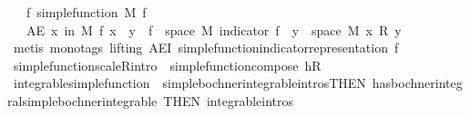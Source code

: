 \begin{isabellebody}
\ \ \ f{\isacharcolon}{\kern0pt}\ {\isachardoublequoteopen}simple{\isacharunderscore}{\kern0pt}function\ M\ f{\isachardoublequoteclose}\isanewline
\ \ \ {\isachardoublequoteopen}AE\ x\ in\ M{\isachardot}{\kern0pt}\ f\ x\ {\isacharequal}{\kern0pt}\ {\isacharparenleft}{\kern0pt}{\isasymSum}y\ {\isasymin}\ f\ {\isacharbackquote}{\kern0pt}\ space\ M{\isachardot}{\kern0pt}\ indicator\ {\isacharparenleft}{\kern0pt}f\ {\isacharminus}{\kern0pt}{\isacharbackquote}{\kern0pt}\ {\isacharbraceleft}{\kern0pt}y{\isacharbraceright}{\kern0pt}\ {\isasyminter}\ space\ M{\isacharparenright}{\kern0pt}\ x\ {\isacharasterisk}{\kern0pt}\isactrlsub R\ y{\isacharparenright}{\kern0pt}{\isachardoublequoteclose}\ \ \isanewline
%
\isadelimproof
\ \ %
\endisadelimproof
%
\isatagproof
{}\isamarkupfalse%
\ {\isacharparenleft}{\kern0pt}metis\ {\isacharparenleft}{\kern0pt}mono{\isacharunderscore}{\kern0pt}tags{\isacharcomma}{\kern0pt}\ lifting{\isacharparenright}{\kern0pt}\ AE{\isacharunderscore}{\kern0pt}I{}\ simple{\isacharunderscore}{\kern0pt}function{\isacharunderscore}{\kern0pt}indicator{\isacharunderscore}{\kern0pt}representation\ f{\isacharparenright}{\kern0pt}%
\endisatagproof
{\isafoldproof}%
%
\isadelimproof
\isanewline
%
\endisadelimproof
\isanewline
{}\isamarkupfalse%
\ simple{\isacharunderscore}{\kern0pt}function{\isacharunderscore}{\kern0pt}scaleR{\isacharbrackleft}{\kern0pt}intro{\isacharbrackright}{\kern0pt}\ {\isacharequal}{\kern0pt}\ simple{\isacharunderscore}{\kern0pt}function{\isacharunderscore}{\kern0pt}compose{}{\isacharbrackleft}{\kern0pt}\ h{\isacharequal}{\kern0pt}{\isachardoublequoteopen}{\isacharparenleft}{\kern0pt}{\isacharasterisk}{\kern0pt}\isactrlsub R{\isacharparenright}{\kern0pt}{\isachardoublequoteclose}{\isacharbrackright}{\kern0pt}\isanewline
{}\isamarkupfalse%
\ integrable{\isacharunderscore}{\kern0pt}simple{\isacharunderscore}{\kern0pt}function\ {\isacharequal}{\kern0pt}\ simple{\isacharunderscore}{\kern0pt}bochner{\isacharunderscore}{\kern0pt}integrable{\isachardot}{\kern0pt}intros{\isacharbrackleft}{\kern0pt}THEN\ has{\isacharunderscore}{\kern0pt}bochner{\isacharunderscore}{\kern0pt}integral{\isacharunderscore}{\kern0pt}simple{\isacharunderscore}{\kern0pt}bochner{\isacharunderscore}{\kern0pt}integrable{\isacharcomma}{\kern0pt}\ THEN\ integrable{\isachardot}{\kern0pt}intros{\isacharbrackright}{\kern0pt}\ \isanewline
\isanewline
\isanewline
%
\isadelimimportant
\isanewline
%
\endisadelimimportant
%
\isatagimportant
{}\isamarkupfalse%

\end{isabellebody}
